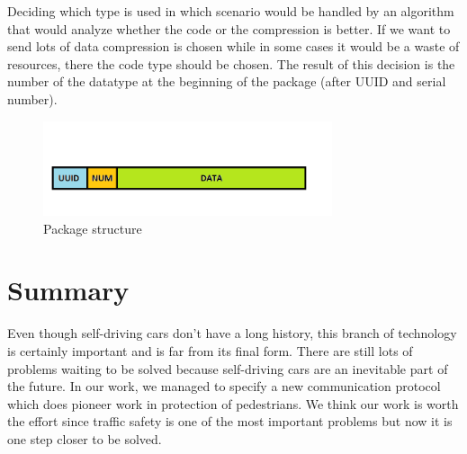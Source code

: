 \documentclass[conference]{IEEEtran}
\begin{document}
Deciding which type is used in which scenario would be handled by an algorithm that would analyze whether the code or the compression is better. If we want to send lots of data compression is chosen while in some cases it would be a waste of resources, there the code type should be chosen. The result of this decision is the number of the datatype at the beginning of the package (after UUID and serial number).

\begin{figure}[ht]
    \centering
    \includegraphics[width=8.5cm]{./pics/Package structure.png}
    \caption{Package structure}
\end{figure}

\section{Summary}
Even though self-driving cars don't have a long history, this branch of technology is certainly important and is far from its final form. There are still lots of problems waiting to be solved because self-driving cars are an inevitable part of the future. In our work, we managed to specify a new communication protocol which does pioneer work in protection of pedestrians. We think our work is worth the effort since traffic safety is one of the most important problems but now it is one step closer to be solved.
\end{document}
